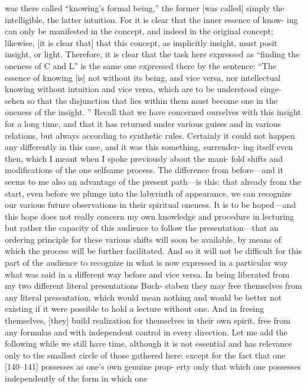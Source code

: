 was there called “knowing’s formal being,” the former [was called] simply the
intelligible, the latter intuition.
 For it is clear that the inner essence of know-
ing can only be manifested in the concept, and indeed in the original concept;
likewise, [it is clear that] that this concept, as implicitly insight, must posit
insight, or light.
 Therefore, it is clear that the task here expressed as “finding
the oneness of C and L” is the same one expressed there by the sentence: “The
essence of knowing [is] not without its being, and vice versa, nor intellectual
knowing without intuition and vice versa, which are to be understood {einge-
sehen} so that the disjunction that lies within them must become one in the
oneness of the insight.
” Recall that we have concerned ourselves with this
insight for a long time, and that it has returned under various guises and in
various relations, but always according to synthetic rules.
 Certainly it could
not happen any differently in this case, and it was this something, surrender-
ing itself even then, which I meant when I spoke previously about the mani-
fold shifts and modifications of the one selfsame process.
 The difference from
before—and it seems to me also an advantage of the present path—is this: that
already from the start, even before we plunge into the labyrinth of appearance,
we can recognize our various future observations in their spiritual oneness.
 It
is to be hoped—and this hope does not really concern my own knowledge and
procedure in lecturing but rather the capacity of this audience to follow the
presentation—that an ordering principle for these various shifts will soon be
available, by means of which the process will be further facilitated.
 And so it
will not be difficult for this part of the audience to recognize in what is now
expressed in a particular way what was said in a different way before and vice
versa.
 In being liberated from my two different literal presentations {Buch-
staben} they may free themselves from any literal presentation, which would
mean nothing and would be better not existing if it were possible to hold a
lecture without one.
 And in freeing themselves, [they] build realization for
themselves in their own spirit, free from any formulas and with independent
control in every direction.
Let me add the following while we still have time, although it is not
essential and has relevance only to the smallest circle of those gathered here:
except for the fact that one [140–141] possesses as one’s own genuine prop-
erty only that which one possesses independently of the form in which one
